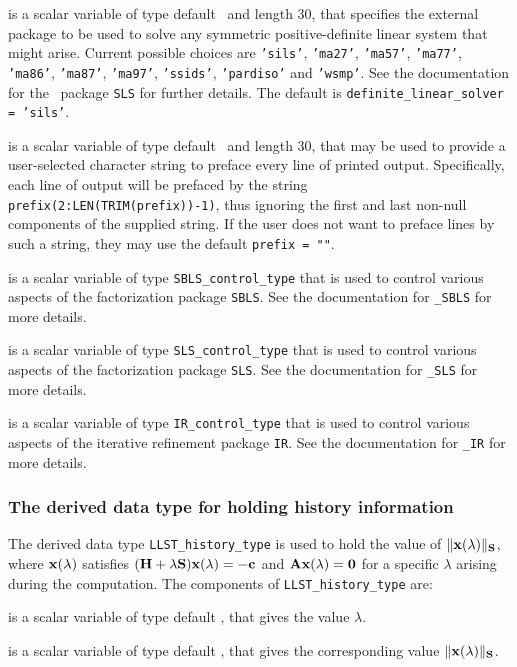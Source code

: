 \documentclass{galahad}
\newcommand{\packagename}{LLST}
\begin{document}
\begin{description}
 is a scalar variable of type default \character\
and length 30, that specifies the external package to be used to
solve any symmetric positive-definite linear system that might arise. 
Current possible
choices are {\tt 'sils'}, {\tt 'ma27'}, {\tt 'ma57'}, {\tt 'ma77'},
{\tt 'ma86'}, {\tt 'ma87'}, {\tt 'ma97'}, {\tt 'ssids'}, {\tt 'pardiso'}
and {\tt 'wsmp'}. 
See the documentation for the \galahad\ package {\tt SLS} for further details. 
The default is {\tt definite\_linear\_solver = 'sils'}.

 is a scalar variable of type default \character\
and length 30, that may be used to provide a user-selected 
character string to preface every line of printed output. 
Specifically, each line of output will be prefaced by the string 
{\tt prefix(2:LEN(TRIM(prefix))-1)},
thus ignoring the first and last non-null components of the
supplied string. If the user does not want to preface lines by such
a string, they may use the default {\tt prefix = ""}.

 is a scalar variable of type 
{\tt SBLS\_control\_type} that is used to control various aspects of the
factorization package {\tt SBLS}. See the documentation for 
{\tt \libraryname\_SBLS} for more details.

 is a scalar variable of type 
{\tt SLS\_control\_type} that is used to control various aspects of the
factorization package {\tt SLS}. See the documentation for 
{\tt \libraryname\_SLS} for more details.

 is a scalar variable of type 
{\tt IR\_control\_type} that is used to control various aspects of the
iterative refinement package {\tt IR}. See the documentation for 
{\tt \libraryname\_IR} for more details.

\end{description}


\subsubsection{The derived data type for holding history
 information}\label{typehist}
The derived data type 
{\tt \packagename\_history\_type} 
is used to hold the value of $\|{\mathbf{x}}(\lambda)\|_{{\mathbf{S}}}$, where
${\mathbf{x}}(\lambda)$ satisfies
$({\mathbf{H}} + \lambda {\mathbf{S}}){\mathbf{x}}(\lambda) = - {\mathbf{c}}$ and ${\mathbf{A}}{\mathbf{x}}(\lambda) = {\mathbf{0}}$
for a specific $\lambda$ arising during the computation.
The components of 
{\tt \packagename\_history\_type} 
are:
\begin{description}
 is a scalar variable of type default \realdp, that gives
 the value $\lambda$.

 is a scalar variable of type default \real, that gives
 the corresponding value $\|{\mathbf{x}}(\lambda)\|_{{\mathbf{S}}}$.

\end{description}
\end{document}
